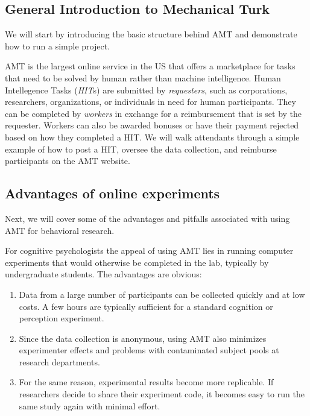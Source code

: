 \documentclass[10pt,letterpaper]{article}
\begin{document}
\subsection{General Introduction to Mechanical Turk}
We will start by introducing the basic structure behind AMT and demonstrate how to run a simple project.

AMT is the largest online service in the US that offers a marketplace for tasks that need to be solved by human rather than machine intelligence.
Human Intellegence Tasks (\emph{HIT}s) are submitted by \emph{requesters}, such as corporations, researchers, organizations, or individuals in need for human participants.
They can be completed by \emph{workers} in exchange for a reimbursement that is set by the requester.
Workers can also be awarded bonuses or have their payment rejected based on how they completed a HIT.
We will walk attendants through a simple example of how to post a HIT, oversee the data collection, and reimburse participants on the AMT website.


\subsection{Advantages of online experiments}
Next, we will cover some of the advantages and pitfalls associated with using AMT for behavioral research.

For cognitive psychologists the appeal of using AMT lies in running computer experiments that would otherwise be completed in the lab, typically by undergraduate students. 
The advantages are obvious:
\begin{enumerate}
\item
    Data from a large number of participants can be collected  quickly and at low costs.
    A few hours are typically sufficient for a standard cognition or perception experiment.
\item
    Since the data collection is anonymous, using AMT also minimizes experimenter effects and problems with contaminated subject pools at research departments.
\item 
    For the same reason, experimental results become more replicable.
    If researchers decide to share their experiment code, it becomes easy to run the same study again with minimal effort.
\end{enumerate}
\end{document}
